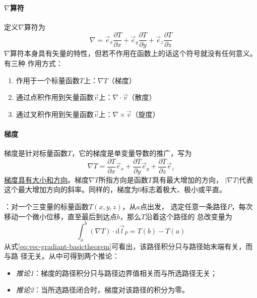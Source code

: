 \paragraph*{$\nabla$算符}
定义$\nabla$算符为
\begin{equation}
    \nabla =    \vec{e}_x \frac{\partial T}{\partial x} 
               +\vec{e}_y \frac{\partial T}{\partial y}
               +\vec{e}_z \frac{\partial T}{\partial z}
    \label{eq:nabla-operator}
\end{equation}
$\nabla$算符本身具有矢量的特性，但若不作用在函数上的话这个符号就没有任何意义。有三种
作用方式：
\begin{enumerate}
    \item 作用于一个标量函数$T$上：$\nabla T$（梯度）
    \item 通过点积作用到矢量函数$\vec{v}$上：$\nabla \cdot \vec{v}$（散度）
    \item 通过叉积作用到矢量函数$\vec{v}$上：$\nabla \times \vec{v}$（旋度）
\end{enumerate}

\paragraph*{梯度}
梯度是针对标量函数$T$，它的梯度是单变量导数的推广，写为
\begin{equation}
    \nabla T =   \frac{\partial T}{\partial x}\vec{e}_x 
               + \frac{\partial T}{\partial y}\vec{e}_y
               + \frac{\partial T}{\partial z}\vec{e}_z
    \label{eq:vec-gradient}
\end{equation}
\uline{梯度具有大小和方向}。梯度$\nabla T$所指方向是函数$T$具有最大增加的方向，
$|\nabla T|$代表这个最大增加方向的斜率。同样的，梯度为$0$标志着极大、极小或平直。

：对一个三变量的标量函数$T(x, y, z)$，从$a$点出发，
选定任意一条路径$P$，每次移动一个微小位移，直至最后到达点$b$，那么$T$沿着这个路径的
总改变量为
\begin{equation}
    \int_{a}^{b} (\nabla T) \cdot \mathrm{d} \vec{l}_{P} = T(b) - T(a)
    \label{eq:vec-gradiant-basictheorem}
\end{equation}
从式\eqref{eq:vec-gradiant-basictheorem}可看出，该路径积分只与路径始末端有关，而与路
径无关。从中可得到两个推论：
\begin{itemize}
    \item \textit{推论1}：梯度的路径积分只与路径边界值相关而与所选路径无关；
    \item \textit{推论2}：当所选路径闭合时，梯度对该路径的积分为零。
\end{itemize}

